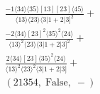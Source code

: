 \documentclass[varwidth, border=5pt]{standalone}
\begin{document}
\begin{my}
$\begin{gathered}
\scriptscriptstyle\frac{-1⟨34⟩⟨35⟩[13][23]⟨45⟩}{⟨13⟩⟨23⟩⟨3|1+2|3]^2}+\\
\scriptscriptstyle\frac{-2⟨34⟩[23]^2⟨35⟩^2⟨24⟩}{⟨13⟩^2⟨23⟩⟨3|1+2|3]^2}+\\
\scriptscriptstyle\frac{2⟨34⟩[23]⟨35⟩^2⟨24⟩}{⟨13⟩^2⟨23⟩^2⟨3|1+2|3]}+\\
\scriptscriptstyle(21354,\;\text{False},\;-)\phantom{+}
\end{gathered}$
\end{my}
\end{document}
